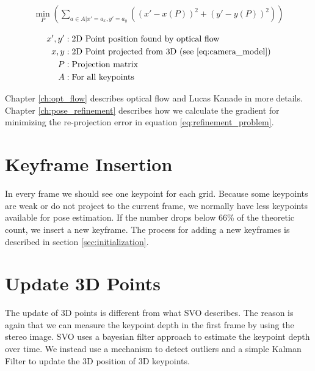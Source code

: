 \documentclass[11pt,a4paper,titlepage,oneside]{report}
\begin{document}
\begin{equation}\label{eq:refinement_problem}
  \begin{gathered}
    \min_P(\sum_{a \in A|x'=a_x,y'=a_y}((x'-x(P))^2+(y'-y(P))^2))\\
  \end{gathered}
\end{equation}
\begin{align*}
  x',y'   &: \text{2D Point position found by optical flow}\\
  x,y     &: \text{2D Point projected from 3D (see \ref{eq:camera_model})}\\
  P       &: \text{Projection matrix}\\
  A       &: \text{For all keypoints}\\
\end{align*}

Chapter \ref{ch:opt_flow} describes optical flow and Lucas Kanade in more details. Chapter \ref{ch:pose_refinement} describes how we calculate the gradient for minimizing the re-projection error in equation \ref{eq:refinement_problem}.

\section{Keyframe Insertion}
In every frame we should see one keypoint for each grid. Because some keypoints are weak or do not project to the current frame, we normally have less keypoints available for pose estimation. If the number drops below 66\% of the theoretic count, we insert a new keyframe. The process for adding a new keyframes is described in section \ref{sec:initialization}.

\section{Update 3D Points}\label{sec:point_update}

The update of 3D points is different from what SVO \cite{svo} describes. The reason is again that we can measure the keypoint depth in the first frame by using the stereo image. SVO uses a bayesian filter approach \cite{svo} to estimate the keypoint depth over time. We instead use a mechanism to detect outliers and a simple Kalman Filter to update the 3D position of 3D keypoints.
\end{document}
